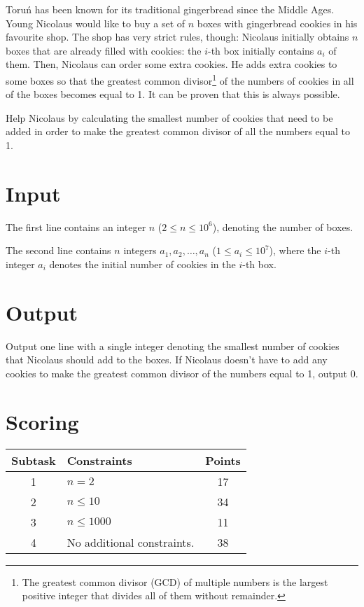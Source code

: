 Toruń has been known for its traditional gingerbread since the Middle Ages. Young Nicolaus would like
to buy a set of $n$ boxes with gingerbread cookies in his favourite shop. The shop has very strict rules,
though: Nicolaus initially obtains $n$ boxes that are already filled with cookies:
the $i$-th box initially contains $a_{i}$ of them. Then, Nicolaus can order some extra cookies.
He adds extra cookies to some boxes so that the greatest common divisor\footnote{
The greatest common divisor (GCD) of multiple numbers is the largest positive integer
that divides all of them without remainder.}
of the numbers of cookies in all of the boxes becomes equal to 1.
It can be proven that this is always possible.

Help Nicolaus by calculating the smallest number of cookies that need to be added in order
to make the greatest common divisor of all the numbers equal to 1.

\section*{Input}
The first line contains an integer $n$ ($2\leq n\leq 10^{6}$),
denoting the number of boxes.

The second line contains $n$ integers $a_{1}, a_{2}, \ldots, a_{n}$ ($1 \leq a_i \leq 10^{7}$),
where the $i$-th integer $a_{i}$ denotes the initial number of cookies in the $i$-th box.

\section*{Output}
Output one line with a single integer denoting the smallest number of cookies that Nicolaus
should add to the boxes.
If Nicolaus doesn't have to add any cookies to make the greatest common divisor
of the numbers equal to 1, output 0.

\section*{Scoring}
\begin{center}
\begin{tabular}{|c|p{13cm}|c|}
\hline
\textbf{Subtask} & \textbf{Constraints} & \textbf{Points} \\
\hline
1 & $n = 2$ & 17 \\\hline
2 & $n \leq 10$ & 34 \\\hline
3 & $n \leq 1000$ & 11 \\\hline
4 & No additional constraints. & 38\\\hline
\end{tabular}
\end{center}

